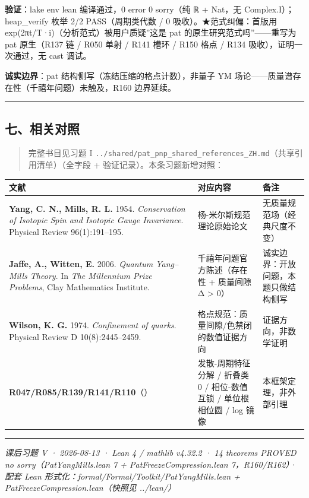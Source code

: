 \documentclass[
]{article}
\newcounter{none} %
\begin{document}
\textbf{验证}：lake env lean 编译通过，0 error 0 sorry（纯 ℝ + Nat，无
Complex.I）；heap\_verify 枚举 2/2 PASS（周期类代数 / 0
吸收）。★范式纠偏：首版用 exp(2πt/T·i)（分析范式）被用户质疑''这是 pat
的原生研究范式吗''------重写为 pat 原生（R137 链 / R050 单射 / R141 槽环
/ R150 格点 / R134 吸收），证明一次通过，无 cast 调试。

\textbf{诚实边界}：pat 结构侧写（冻结压缩的格点计数），非量子 YM
场论------质量谱存在性（千禧年问题）未触及，R160 边界延续。

\begin{center}\rule{0.5\linewidth}{0.5pt}\end{center}

\subsection{七、相关对照}\label{ux4e03ux76f8ux5173ux5bf9ux7167}

\begin{quote}
完整书目见习题 I
\texttt{../shared/pat\_pnp\_shared\_references\_ZH.md}（共享引用清单）（全字段
+ 验证记录）。本条习题新增对照：
\end{quote}

{\def\LTcaptype{none} %
\begin{longtable}[]{@{}
 >{\raggedright\arraybackslash}p{}
 >{\raggedright\arraybackslash}p{}
 >{\raggedright\arraybackslash}p{}@{}}
\toprule\noalign{}
\begin{minipage}[b]{\linewidth}\raggedright
文献
\end{minipage} & \begin{minipage}[b]{\linewidth}\raggedright
对应内容
\end{minipage} & \begin{minipage}[b]{\linewidth}\raggedright
备注
\end{minipage} \\
\midrule\noalign{}
\endhead
\bottomrule\noalign{}
\endlastfoot
\textbf{Yang, C. N., Mills, R. L.} 1954. \emph{Conservation of Isotopic
Spin and Isotopic Gauge Invariance}. Physical Review 96(1):191--195. &
杨-米尔斯规范理论原始论文 & 无质量规范场（经典尺度不变） \\
\textbf{Jaffe, A., Witten, E.} 2006. \emph{Quantum Yang--Mills Theory}.
In \emph{The Millennium Prize Problems}, Clay Mathematics Institute. &
千禧年问题官方陈述（存在性 + 质量间隙 Δ \textgreater{} 0） &
诚实边界：开放问题，本题只做结构侧写 \\
\textbf{Wilson, K. G.} 1974. \emph{Confinement of quarks}. Physical
Review D 10(8):2445--2459. & 格点规范：质量间隙/色禁闭的数值证据方向 &
证据方向，非数学证明 \\
\textbf{R047/R085/R139/R141/R110}（） & 发散-周期特征分解 / 折叠类
0 / 相位-数值互锁 / 单位根相位圆 / log 镜像 & 本框架定理，非外部引理 \\
\end{longtable}
}

\begin{center}\rule{0.5\linewidth}{0.5pt}\end{center}

\emph{课后习题 V · 2026-08-13 · Lean 4 / mathlib v4.32.2 · 14
theorems PROVED no sorry（PatYangMills.lean 7 +
PatFreezeCompression.lean 7，R160/R162）· 配套 Lean
形式化：formal/Formal/Toolkit/PatYangMills.lean +
PatFreezeCompression.lean（快照见 ../lean/）}
\end{document}
